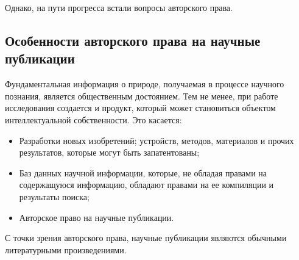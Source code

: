 \documentclass [10pt, a5paper]{article}
\begin{document}
Однако, на пути прогресса встали вопросы авторского права.

\subsection*{Особенности авторского права на научные публикации}

Фундаментальная информация о природе, получаемая в процессе научного познания, является общественным достоянием. Тем не менее, при работе исследования создается и продукт, который может становиться объектом интеллектуальной собственности. Это касается:
\begin{itemize}
  \item Разработки новых изобретений; устройств, методов, материалов и прочих результатов, которые могут быть запатентованы;
  \item Баз данных научной информации, которые, не обладая правами на содержащуюся информацию, обладают правами на ее компиляции и результаты поиска;
  \item Авторское право на научные публикации.
\end{itemize}

С точки зрения авторского права, научные публикации являются обычными литературными произведениями.
\end{document}
